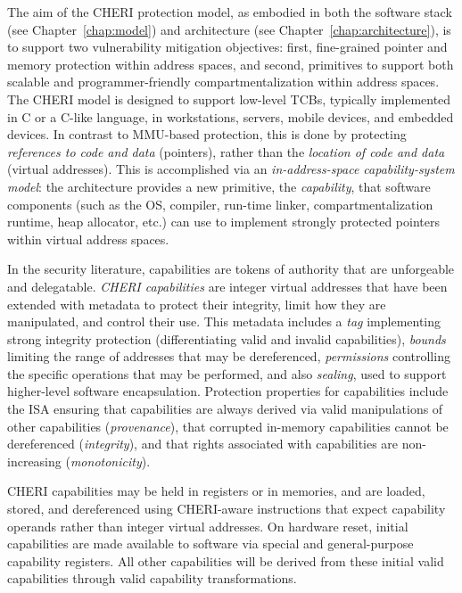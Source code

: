 The aim of the CHERI protection model, as embodied in both the software stack
(see Chapter~\ref{chap:model}) and architecture (see
Chapter~\ref{chap:architecture}), is to support two vulnerability mitigation
objectives: first,
fine-grained pointer and memory protection within address spaces, and second,
primitives to support both scalable and programmer-friendly
compartmentalization within address spaces.
The CHERI model is designed to support low-level TCBs, typically implemented
in C or a C-like language, in workstations, servers, mobile devices, and
embedded devices.
In contrast to MMU-based protection, this is done by protecting
\textit{references to code and data} (pointers), rather than the
\textit{location of code and data} (virtual addresses).
This is accomplished via an \textit{in-address-space capability-system model}:
the architecture provides a new primitive, the \textit{capability}, that
software components (such as the OS, compiler, run-time linker,
compartmentalization runtime, heap allocator, etc.) can use to implement
strongly protected pointers within virtual address spaces.


In the security literature, capabilities are tokens of authority that are
unforgeable and delegatable.
\textit{CHERI capabilities} are integer virtual addresses that have been
extended with metadata to protect their integrity, limit how they are
manipulated,  and control their use.
This metadata includes a \textit{tag} implementing strong integrity
protection (differentiating valid and invalid capabilities), \textit{bounds}
limiting the range of addresses that may be
dereferenced, \textit{permissions} controlling the specific operations that
may be performed, and also
\textit{sealing}, used to support higher-level software encapsulation.
Protection properties for capabilities include the ISA ensuring that
capabilities are always derived via valid manipulations of other capabilities
(\textit{provenance}), that corrupted in-memory capabilities cannot be
dereferenced (\textit{integrity}), and that rights associated with
capabilities are non-increasing (\textit{monotonicity}).

CHERI capabilities may be held in registers or in memories, and are loaded,
stored, and dereferenced using CHERI-aware instructions that expect
capability operands rather than integer virtual addresses.
On hardware reset, initial capabilities are made available to software via
special and general-purpose capability registers.
All other capabilities will be derived from these initial valid capabilities
through valid capability transformations.

